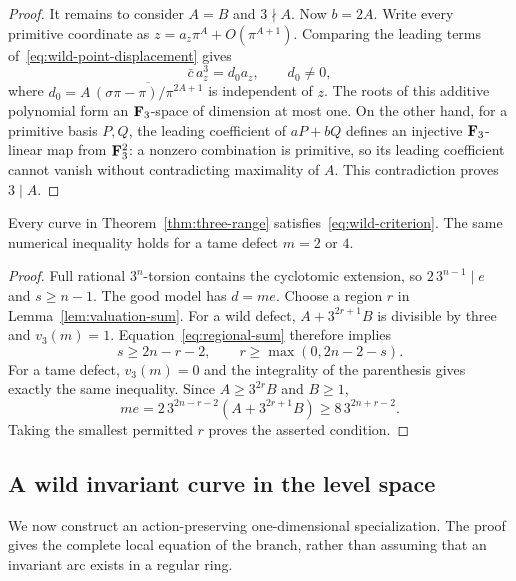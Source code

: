 \begin{proof}
It remains to consider $A=B$ and $3\nmid A$. Now $b=2A$. Write every primitive coordinate as $z=a_z\pi^A+O(\pi^{A+1})$. Comparing the leading terms of~\eqref{eq:wild-point-displacement} gives
\[
 \bar c\,a_z^3=d_0a_z,\qquad d_0\ne0,
\]
where $d_0=A\,\overline{(\sigma\pi-\pi)/\pi^{2A+1}}$ is independent of $z$. The roots of this additive polynomial form an $\mathbf F_3$-space of dimension at most one. On the other hand, for a primitive basis $P,Q$, the leading coefficient of $aP+bQ$ defines an injective $\mathbf F_3$-linear map from $\mathbf F_3^2$: a nonzero combination is primitive, so its leading coefficient cannot vanish without contradicting maximality of $A$. This contradiction proves $3\mid A$.
\end{proof}

\begin{proposition}\label{prop:necessary-wild}
Every curve in Theorem~\ref{thm:three-range} satisfies~\eqref{eq:wild-criterion}. The same numerical inequality holds for a tame defect $m=2$ or $4$.
\end{proposition}

\begin{proof}
Full rational $3^n$-torsion contains the cyclotomic extension, so $2\,3^{n-1}\mid e$ and $s\ge n-1$. The good model has $d=me$. Choose a region $r$ in Lemma~\ref{lem:valuation-sum}. For a wild defect, $A+3^{2r+1}B$ is divisible by three and $v_3(m)=1$. Equation~\eqref{eq:regional-sum} therefore implies
\[
 s\ge2n-r-2,\qquad r\ge\max(0,2n-2-s).
\]
For a tame defect, $v_3(m)=0$ and the integrality of the parenthesis gives exactly the same inequality. Since $A\ge3^{2r}B$ and $B\ge1$,
\[
 me=2\,3^{2n-r-2}(A+3^{2r+1}B)
       \ge8\,3^{2n+r-2}.
\]
Taking the smallest permitted $r$ proves the asserted condition.
\end{proof}

\subsection{A wild invariant curve in the level space}
We now construct an action-preserving one-dimensional specialization. The proof gives the complete local equation of the branch, rather than assuming that an invariant arc exists in a regular ring.

